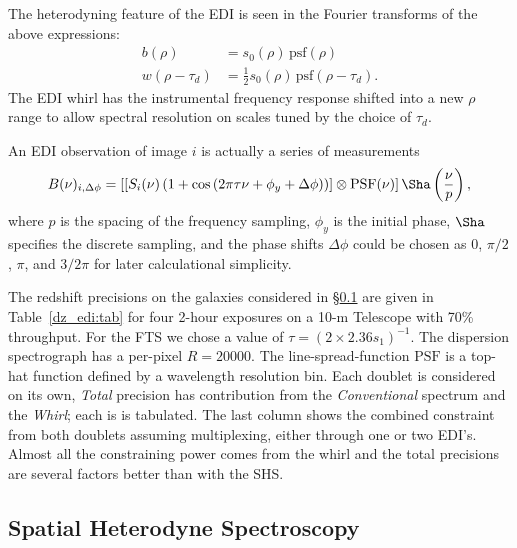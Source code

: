 \documentclass[preprint]{aastex}
\begin{document}
The heterodyning feature of the EDI is seen in the Fourier transforms of the above expressions:
\begin{align}
b(\rho) & =s_0(\rho) \, \mbox{psf}(\rho)\\
w(\rho -\tau_d) & =\frac{1}{2} s_0(\rho) \, \mbox{psf}(\rho-\tau_d).
\end{align}
The EDI whirl has the instrumental frequency response shifted into a new $\rho$ range to allow
spectral
resolution on scales tuned by the choice of $\tau_d$.

An EDI observation of image $i$ is actually a series of measurements
\begin{equation}
B(\nu)_{i,\Delta\phi} = \left[\left[S_i(\nu)\left(1+\cos{\left(2\pi\tau\nu+\phi_y+\Delta\phi \right)} \right)\right]\otimes \mbox{PSF}(\nu)\right]\Sha\left(\frac{\nu}{p}\right),
\end{equation}
where $p$ is the spacing of the frequency sampling, $\phi_y$ is the initial phase, $\Sha$ specifies the discrete sampling,
and the phase shifts $\Delta\phi$ could be chosen as
$0$, $\pi/2$, $\pi$, and $3/2\pi$ for later calculational simplicity.

The redshift precisions on the galaxies considered in \S\ref{SHS:sec} are given in Table~\ref{dz_edi:tab}
for four 2-hour exposures on a 10-m Telescope with 70\% throughput.  For the FTS we
chose a value of $\tau=(2\times2.36 s_1)^{-1}$.
The dispersion spectrograph has a per-pixel $R=20000$.  The line-spread-function $\mbox{PSF}$ is a top-hat function defined by a wavelength
resolution bin.  Each doublet is considered on its own, {\it Total} precision has contribution from the {\it Conventional} spectrum and the {\it Whirl}; each is
is tabulated.  The last column shows the combined constraint from both doublets assuming multiplexing, either through one or two EDI's.
Almost all the constraining power comes from the whirl and the total precisions are several factors better than with the SHS.


\subsection{Spatial Heterodyne Spectroscopy}
\label{SHS:sec}
\end{document}
